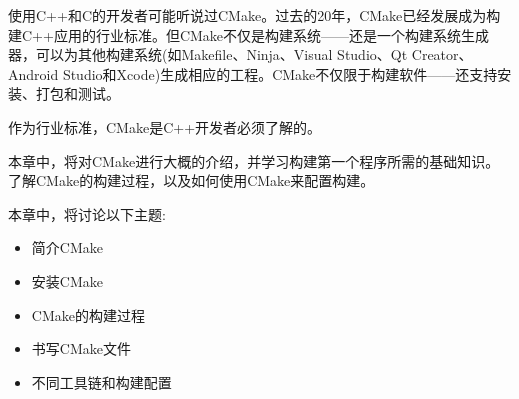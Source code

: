 使用C++和C的开发者可能听说过CMake。过去的20年，CMake已经发展成为构建C++应用的行业标准。但CMake不仅是构建系统——还是一个构建系统生成器，可以为其他构建系统(如Makefile、Ninja、Visual Studio、Qt Creator、Android Studio和Xcode)生成相应的工程。CMake不仅限于构建软件——还支持安装、打包和测试。

作为行业标准，CMake是C++开发者必须了解的。

本章中，将对CMake进行大概的介绍，并学习构建第一个程序所需的基础知识。了解CMake的构建过程，以及如何使用CMake来配置构建。

本章中，将讨论以下主题:

\begin{itemize}
\item 简介CMake
\item 安装CMake
\item CMake的构建过程
\item 书写CMake文件
\item 不同工具链和构建配置
\end{itemize}
